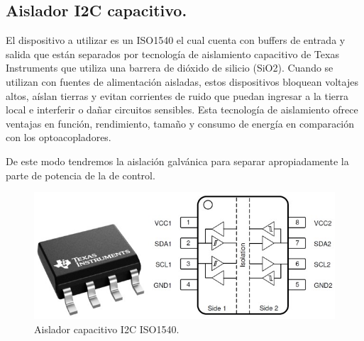 \subsection{Aislador I2C capacitivo.}
El dispositivo a utilizar es un ISO1540 \cite{ISO1540} el cual cuenta con buffers de entrada y salida que están separados por tecnología de aislamiento capacitivo de Texas Instruments que utiliza una barrera de dióxido de silicio (SiO2). Cuando se utilizan con fuentes de alimentación aisladas, estos dispositivos bloquean voltajes altos, aíslan tierras y evitan corrientes de ruido que puedan ingresar a la tierra local e interferir o dañar circuitos sensibles. Esta tecnología de aislamiento ofrece ventajas en función, rendimiento, tamaño y consumo de energía en comparación con los optoacopladores. \par 
De este modo tendremos la aislación galvánica para separar apropiadamente la parte de potencia de la de control.
\begin{figure}[H]
    \centering
    \includegraphics[scale=0.3]{./imagenes/optoi2c.jpg}
    \caption{Aislador capacitivo I2C ISO1540.}
    \label{F:optoi2c}
\end{figure}

